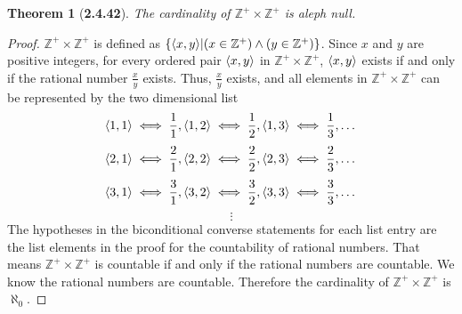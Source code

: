 \documentclass[a4paper, 12pt]{article}
\theoremstyle{plain}
\newtheorem*{theorem*}{Theorem}
\DeclarePairedDelimiter{\ord}{\langle}{\rangle}
\begin{document}
	
\begin{theorem*}[\textbf{2.4.42}]
    The cardinality of $\mathbb{Z^{+}} \times \mathbb{Z^{+}}$ is aleph null.
\end{theorem*}

\begin{proof}
    $\mathbb{Z^{+}} \times \mathbb{Z^{+}}$ is defined as 
    $\{\ord{x, y} | (x \in \mathbb{Z^{+}}) \land (y \in \mathbb{Z^{+}})\}$. 
    Since $x$ and $y$ are positive integers, for every ordered pair $\ord{x, y}$ in 
    $\mathbb{Z^{+}} \times \mathbb{Z^{+}}$, $\ord{x, y}$ exists if and only if the rational number 
    $\frac{x}{y}$ exists. Thus, $\frac{x}{y}$ exists, and all elements in 
    $\mathbb{Z^{+}} \times \mathbb{Z^{+}}$ can be represented by the two dimensional list
    $$\ord{1,1} \iff \frac{1}{1}, \ord{1,2} \iff \frac{1}{2}, \ord{1,3} \iff \frac{1}{3}, \dots$$
    $$\ord{2,1} \iff \frac{2}{1}, \ord{2,2} \iff \frac{2}{2}, \ord{2,3} \iff \frac{2}{3}, \dots$$
    $$\ord{3,1} \iff \frac{3}{1}, \ord{3,2} \iff \frac{3}{2}, \ord{3,3} \iff \frac{3}{3}, \dots$$
    $$\vdots$$
    The hypotheses in the biconditional converse statements for each list entry are the list 
    elements in the proof for the countability of rational numbers. That means 
    $\mathbb{Z^{+}} \times \mathbb{Z^{+}}$ is countable if and only if the rational numbers are 
    countable. We know the rational numbers are countable. Therefore the cardinality of 
    $\mathbb{Z^{+}} \times \mathbb{Z^{+}}$ is $\aleph_0$.
\end{proof}
\end{document}
